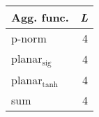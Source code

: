 \begin{tabular}{lr}
\toprule
     \textbf{Agg. func.} &  \emph{L} \\
\midrule
                  p-norm &         4 \\
 planar$_{\mathrm{sig}}$ &         4 \\
planar$_{\mathrm{tanh}}$ &         4 \\
                     sum &         4 \\
\bottomrule
\end{tabular}
